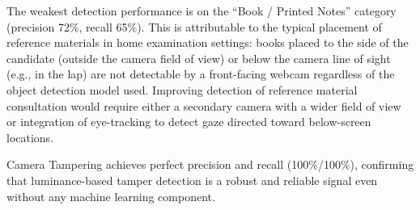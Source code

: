 The weakest detection performance is on the ``Book / Printed Notes'' category (precision 72\%, recall 65\%). This is attributable to the typical placement of reference materials in home examination settings: books placed to the side of the candidate (outside the camera field of view) or below the camera line of sight (e.g., in the lap) are not detectable by a front-facing webcam regardless of the object detection model used. Improving detection of reference material consultation would require either a secondary camera with a wider field of view or integration of eye-tracking to detect gaze directed toward below-screen locations.

Camera Tampering achieves perfect precision and recall (100\%/100\%), confirming that luminance-based tamper detection is a robust and reliable signal even without any machine learning component.
